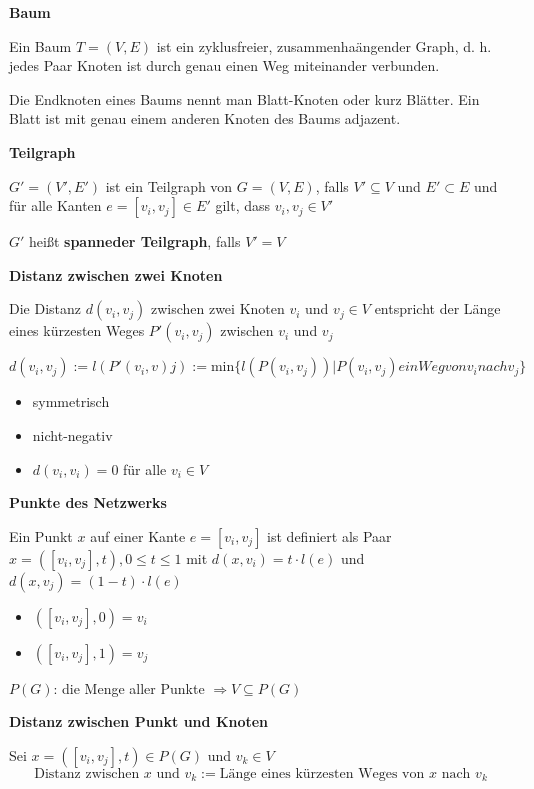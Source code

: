     \par \textbf{Baum}
    \par Ein Baum $T = (V,E)$ ist ein zyklusfreier, zusammenhaängender Graph, d. h. jedes Paar Knoten ist durch genau einen Weg miteinander verbunden.
    \par Die Endknoten eines Baums nennt man Blatt-Knoten oder kurz Blätter. Ein Blatt ist mit genau einem anderen Knoten des Baums adjazent.

    \par \textbf{Teilgraph}
    \par $G' = (V', E')$ ist ein Teilgraph von $G= (V,E)$, falls $V' \subseteq V$ und $E' \subset E$ und für alle Kanten $e = [v_i, v_j] \in E'$ gilt, dass $v_i, v_j \in V'$
    \par $G'$ heißt \textbf{spanneder Teilgraph}, falls $V' = V$

    \par \textbf{Distanz zwischen zwei Knoten}
    \par Die Distanz $d(v_i, v_j)$ zwischen zwei Knoten $v_i$ und $v_j \in V$ entspricht der Länge eines kürzesten Weges $P'(v_i, v_j)$ zwischen $v_i$ und $v_j$

    \[
    d(v_i, v_j) := l(P'(v_i, v)j) := \text{min}\{l(P(v_i,v_j))|P(v_i, v_j) ein Weg von v_i nach v_j\}
    \]
    
    \begin{itemize}
      \item symmetrisch
      \item nicht-negativ
      \item $d(v_i, v_i) = 0$ für alle $v_i \in V$
    \end{itemize}

    \par \textbf{Punkte des Netzwerks}
    \par Ein Punkt $x$ auf einer Kante $e = [v_i, v_j]$ ist definiert als Paar $x = ([v_i, v_j], t), 0 \leq t \leq 1$ mit $d(x, v_i) = t \cdot l(e)$ und $d(x, v_j) = (1-t)\cdot l(e)$

    \begin{itemize}
      \item $([v_i, v_j], 0) = v_i$
      \item $([v_i, v_j], 1) = v_j$
    \end{itemize}

    \par $P(G)$: die Menge aller Punkte $\Rightarrow V \subseteq P(G)$

    \par \textbf{Distanz zwischen Punkt und Knoten}
    \par Sei $x = ([v_i, v_j], t) \in P(G)$ und $v_k \in V$
    \[
      \text{Distanz zwischen } x \text{ und } v_k := \text{Länge eines kürzesten Weges von } x \text{ nach } v_k
    \]

